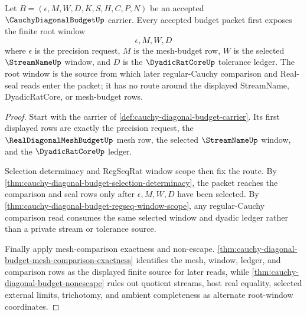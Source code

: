 \begin{theorem}
\label{thm:cauchy-diagonal-budget-root-window-source}
Let $B=(\epsilon,M,W,D,K,S,H,C,P,N)$ be an accepted $\CauchyDiagonalBudgetUp$ carrier. Every accepted budget packet first exposes the finite root window
$$
\epsilon,M,W,D
$$
where $\epsilon$ is the precision request, $M$ is the mesh-budget row, $W$ is the selected $\StreamNameUp$ window, and $D$ is the $\DyadicRatCoreUp$ tolerance ledger. The root window is the source from which later regular-Cauchy comparison and Real-seal reads enter the packet; it has no route around the displayed StreamName, DyadicRatCore, or mesh-budget rows.
\end{theorem}
\begin{proof}
Start with the carrier of \autoref{def:cauchy-diagonal-budget-carrier}. Its first displayed rows are exactly the precision request, the $\RealDiagonalMeshBudgetUp$ mesh row, the selected $\StreamNameUp$ window, and the $\DyadicRatCoreUp$ ledger.

Selection determinacy and RegSeqRat window scope then fix the route. By \autoref{thm:cauchy-diagonal-budget-selection-determinacy}, the packet reaches the comparison and seal rows only after $\epsilon,M,W,D$ have been selected. By \autoref{thm:cauchy-diagonal-budget-regseq-window-scope}, any regular-Cauchy comparison read consumes the same selected window and dyadic ledger rather than a private stream or tolerance source.

Finally apply mesh-comparison exactness and non-escape. \autoref{thm:cauchy-diagonal-budget-mesh-comparison-exactness} identifies the mesh, window, ledger, and comparison rows as the displayed finite source for later reads, while \autoref{thm:cauchy-diagonal-budget-nonescape} rules out quotient streams, host real equality, selected external limits, trichotomy, and ambient completeness as alternate root-window coordinates.
\end{proof}

